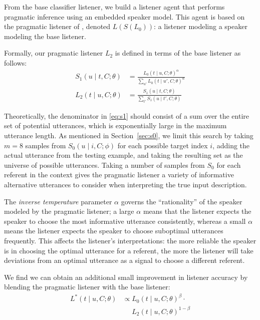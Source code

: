 \documentclass[11pt,letterpaper]{article}
\newcommand{\term}{\textit}
\newcommand{\Listener}{L}
\newcommand{\Speaker}{S}
\newcommand{\utt}{u}
\newcommand{\context}{C}
\newcommand{\target}{t}
\newcommand{\numsamples}{m}
\renewcommand{\|}{\mid}
\newcommand{\secref}[1]{Section~\ref{#1}}
\begin{document}
From the base classifier listener, we build a listener agent that performs
pragmatic inference using an embedded speaker model. This agent is based on the
pragmatic listener of , denoted
$\Listener(\Speaker(\Listener_0))$: a listener modeling a speaker modeling the
base listener.

Formally, our pragmatic listener $\Listener_2$ is defined in terms of the base
listener as follows:
\begin{align}
\Speaker_1(\utt \| \target, \context; \theta) &= \frac{\Listener_0(\target \| \utt, \context; \theta)^\alpha}{\sum_{\utt'} \Listener_0(\target \| \utt', \context; \theta)^\alpha} \label{eq:s1} \\
\Listener_2(\target \| \utt, \context; \theta) &= \frac{\Speaker_1(\utt \| \target, \context; \theta)}{\sum_{\target'} \Speaker_1(\utt \| \target', \context; \theta)} \nonumber
\end{align}

Theoretically, the denominator in \eqref{eq:s1} should consist of a sum over
the entire set of potential utterances, which is exponentially large in the
maximum utterance length. As mentioned in \secref{sec:s0}, we limit this search by
taking $\numsamples = 8$ samples from $\Speaker_0(\utt \| i, \context; \phi)$ for
each possible target index $i$, adding the actual utterance from the testing example,
and taking the resulting set as the universe of possible utterances. Taking a number
of samples from $\Speaker_0$ for each referent in the context gives the pragmatic
listener a variety of informative alternative utterances to consider when
interpreting the true input description.

The \term{inverse temperature} parameter $\alpha$ governs the ``rationality'' of
the speaker modeled by the pragmatic listener; a large $\alpha$ means that the
listener expects the speaker to choose the most informative utterance consistently, 
whereas a small $\alpha$ means the listener expects the speaker to choose suboptimal
utterances frequently. This affects the listener's interpretations: the more reliable
the speaker is in choosing the optimal utterance for a referent, the more the
listener will take deviations from an optimal utterance as a signal to choose a
different referent.

We find we can obtain an additional small improvement in listener accuracy
by blending the pragmatic listener with the base listener:
\begin{align}
\Listener^{*}(\target \| \utt, \context; \theta) &\propto {\Listener_0}(\target \| \utt, \context; \theta)^{\beta} \cdot {} \nonumber \\
&\phantom{{} \propto {}} \Listener_2(\target \| \utt, \context; \theta)^{1-\beta}  \label{eq:beta}
\end{align}
\end{document}
